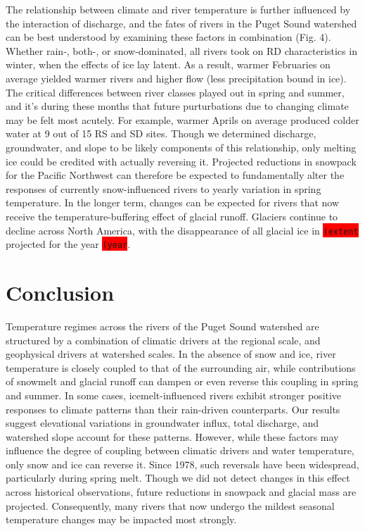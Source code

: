 \documentclass[notitlepage]{article}
\begin{document}
The relationship between climate and river temperature is further influenced by the interaction of discharge, and the fates of rivers in the Puget Sound watershed can be best understood by examining these factors in combination (Fig. 4). Whether rain-, both-, or snow-dominated, all rivers took on RD characteristics in winter, when the effects of ice lay latent. As a result, warmer Februaries on average yielded warmer rivers and higher flow (less precipitation bound in ice). The critical differences between river classes played out in spring and summer, and it's during these months that future purturbations due to changing climate may be felt most acutely. For example, warmer Aprils on average produced colder water at 9 out of 15 RS and SD sites. Though we determined discharge, groundwater, and slope to be likely components of this relationship, only melting ice could be credited with actually reversing it. Projected reductions in snowpack for the Pacific Northwest can therefore be expected to fundamentally alter the responses of currently snow-influenced rivers to yearly variation in spring temperature. In the longer term, changes can be expected for rivers that now receive the temperature-buffering effect of glacial runoff. Glaciers continue to decline across North America, with the disappearance of all glacial ice in \colorbox{red}{\lstinline{(extent}} projected for the year \colorbox{red}{\lstinline{(year}}.

\section*{Conclusion}

Temperature regimes across the rivers of the Puget Sound watershed are structured by a combination of climatic drivers at the regional scale, and geophysical drivers at watershed scales. In the absence of snow and ice, river temperature is closely coupled to that of the surrounding air, while contributions of snowmelt and glacial runoff can dampen or even reverse this coupling in spring and summer. In some cases, icemelt-influenced rivers exhibit stronger positive responses to climate patterns than their rain-driven counterparts. Our results suggest elevational variations in groundwater influx, total discharge, and watershed slope account for these patterns. However, while these factors may influence the degree of coupling between climatic drivers and water temperature, only snow and ice can reverse it. Since 1978, such reversals have been widespread, particularly during spring melt. Though we did not detect changes in this effect across historical observations, future reductions in snowpack and glacial mass are projected. Consequently, many rivers that now undergo the mildest seasonal temperature changes may be impacted most strongly.
\clearpage
\end{document}

